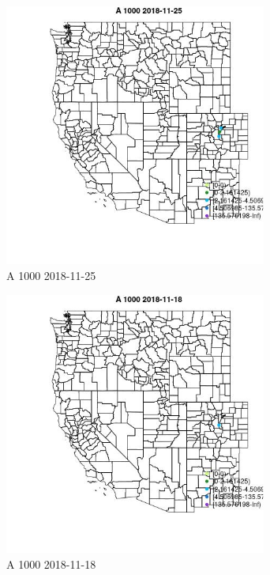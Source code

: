\begin{figure} 
\centering  
\includegraphics[width=0.77\textwidth]{Code_Outputs/Report_ML_input_PM25_Step4_part_e_de_duplicated_aveswNAs_MapObsA_10002018-11-25.jpg} 
\caption{\label{fig:Report_ML_input_PM25_Step4_part_e_de_duplicated_aveswNAsMapObsA_10002018-11-25}A 1000 2018-11-25} 
\end{figure} 
 

\begin{figure} 
\centering  
\includegraphics[width=0.77\textwidth]{Code_Outputs/Report_ML_input_PM25_Step4_part_e_de_duplicated_aveswNAs_MapObsA_10002018-11-18.jpg} 
\caption{\label{fig:Report_ML_input_PM25_Step4_part_e_de_duplicated_aveswNAsMapObsA_10002018-11-18}A 1000 2018-11-18} 
\end{figure} 
 

